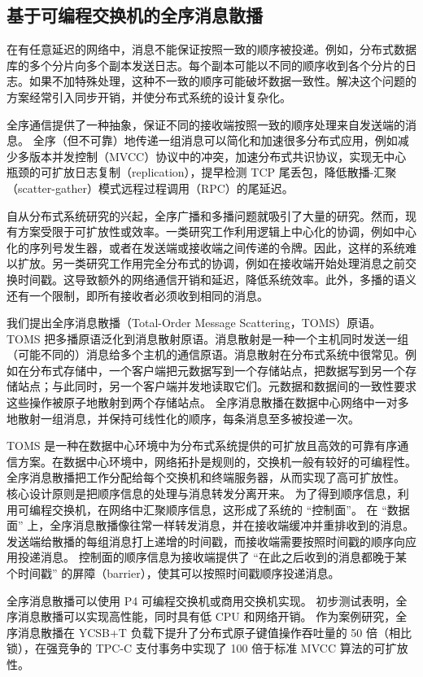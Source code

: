 \iffalse
\subsection{基于可编程交换机的全序消息散播}


在有任意延迟的网络中，消息不能保证按照一致的顺序被投递。例如，分布式数据库的多个分片向多个副本发送日志。每个副本可能以不同的顺序收到各个分片的日志。如果不加特殊处理，这种不一致的顺序可能破坏数据一致性。解决这个问题的方案经常引入同步开销，并使分布式系统的设计复杂化。

全序通信提供了一种抽象，保证不同的接收端按照一致的顺序处理来自发送端的消息。
全序（但不可靠）地传递一组消息可以简化和加速很多分布式应用，例如减少多版本并发控制（MVCC）协议中的冲突，加速分布式共识协议，实现无中心瓶颈的可扩放日志复制（replication），提早检测 TCP 尾丢包，降低散播-汇聚（scatter-gather）模式远程过程调用（RPC）的尾延迟。

自从分布式系统研究的兴起，全序广播和多播问题就吸引了大量的研究。然而，现有方案受限于可扩放性或效率。一类研究工作利用逻辑上中心化的协调，例如中心化的序列号发生器，或者在发送端或接收端之间传递的令牌。因此，这样的系统难以扩放。另一类研究工作用完全分布式的协调，例如在接收端开始处理消息之前交换时间戳。这导致额外的网络通信开销和延迟，降低系统效率。此外，多播的语义还有一个限制，即所有接收者必须收到相同的消息。

我们提出全序消息散播（Total-Order Message Scattering，TOMS）原语。
TOMS 把多播原语泛化到消息散射原语。消息散射是一种一个主机同时发送一组（可能不同的）消息给多个主机的通信原语。消息散射在分布式系统中很常见。例如在分布式存储中，一个客户端把元数据写到一个存储站点，把数据写到另一个存储站点；与此同时，另一个客户端并发地读取它们。元数据和数据间的一致性要求这些操作被原子地散射到两个存储站点。
全序消息散播在数据中心网络中一对多地散射一组消息，并保持可线性化的顺序，每条消息至多被投递一次。

TOMS 是一种在数据中心环境中为分布式系统提供的可扩放且高效的可靠有序通信方案。在数据中心环境中，网络拓扑是规则的，交换机一般有较好的可编程性。
全序消息散播把工作分配给每个交换机和终端服务器，从而实现了高可扩放性。
核心设计原则是把顺序信息的处理与消息转发分离开来。
为了得到顺序信息，利用可编程交换机，在网络中汇聚顺序信息，这形成了系统的 ``控制面''。
在 ``数据面'' 上，全序消息散播像往常一样转发消息，并在接收端缓冲并重排收到的消息。
发送端给散播的每组消息打上递增的时间戳，而接收端需要按照时间戳的顺序向应用投递消息。
控制面的顺序信息为接收端提供了 ``在此之后收到的消息都晚于某个时间戳'' 的屏障（barrier），使其可以按照时间戳顺序投递消息。

全序消息散播可以使用 P4 可编程交换机或商用交换机实现。
初步测试表明，全序消息散播可以实现高性能，同时具有低 CPU 和网络开销。
作为案例研究，全序消息散播在 YCSB+T 负载下提升了分布式原子键值操作吞吐量的 50 倍（相比锁），在强竞争的 TPC-C 支付事务中实现了 100 倍于标准 MVCC 算法的可扩放性。

